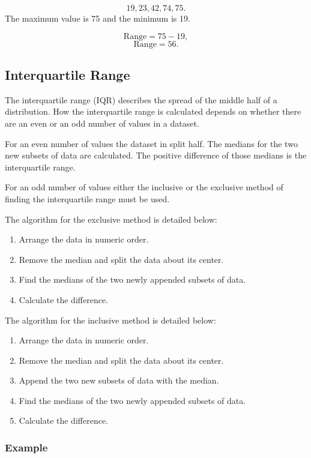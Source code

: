 \documentclass[
]{book}
\providecommand{\tightlist}{%
  \setlength{\itemsep}{0pt}\setlength{\parskip}{0pt}}
\begin{document}
\[ 19, 23, 42, 74, 75. \]
The maximum value is 75 and the minimum is 19.

\[ \textrm{Range}= 75 - 19, \]
\[ \textrm{Range} = 56.\]

\hypertarget{iqr}{%
\subsection{Interquartile Range}\label{iqr}}

The interquartile range (IQR) describes the spread of the middle half of a distribution. How the interquartile range is calculated depends on whether there are an even or an odd number of values in a dataset.

For an even number of values the dataset in split half. The medians for the two new subsets of data are calculated. The positive difference of those medians is the interquartile range.

For an odd number of values either the inclusive or the exclusive method of finding the interquartile range must be used.

The algorithm for the exclusive method is detailed below:

\begin{enumerate}
\def\labelenumi{\arabic{enumi}.}
\tightlist
\item
  Arrange the data in numeric order.
\item
  Remove the median and split the data about its center.
\item
  Find the medians of the two newly appended subsets of data.
\item
  Calculate the difference.
\end{enumerate}

The algorithm for the inclusive method is detailed below:

\begin{enumerate}
\def\labelenumi{\arabic{enumi}.}
\tightlist
\item
  Arrange the data in numeric order.
\item
  Remove the median and split the data about its center.
\item
  Append the two new subsets of data with the median.
\item
  Find the medians of the two newly appended subsets of data.
\item
  Calculate the difference.
\end{enumerate}

\hypertarget{example-8}{%
\subsubsection{Example}\label{example-8}}
\end{document}
